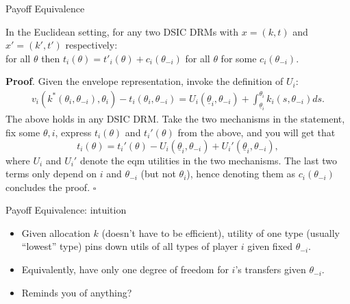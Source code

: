 \documentclass[english,10pt
,aspectratio=169
]{beamer}
\begin{document}
\begin{frame}{Payoff Equivalence}
	\begin{theorem}
		In the Euclidean setting, for any two DSIC DRMs with $x = (k,t)$ and $x' = (k',t')$ respectively:
		\\ 	
		 for all $\theta$ \alert{then $t_i(\theta) = t'_i(\theta) + c_i (\theta_{-i})$} for all $\theta$ for some $c_i(\theta_{-i})$.
	\end{theorem}
	\pause
	\textbf{Proof}. Given the envelope representation, invoke the definition of $U_i$:
	\vspace{-0.5em}\begin{align*}
		v_i(k^*(\theta_i,\theta_{-i}),\theta_i) - t_i(\theta_i,\theta_{-i}) = U_i (\underline{\theta}_i,\theta_{-i}) + \int_{\underline{\theta}_i}^{\theta_i} k_i(s,\theta_{-i}) d s.
	\end{align*}
	The above holds in any DSIC DRM. Take the two mechanisms in the statement, fix some $\theta,i$, express $t_i(\theta)$ and $t_i'(\theta)$ from the above, and you will get that
	\vspace{-0.5em}$$ t_i(\theta) = t_i'(\theta) - U_i (\underline{\theta}_i,\theta_{-i}) + U_i' (\underline{\theta}_i,\theta_{-i}),$$
	where $U_i$ and $U_i'$ denote the eqm utilities in the two mechanisms. The last two terms only depend on $i$ and $\theta_{-i}$ (but not $\theta_i$), hence denoting them as $c_i(\theta_{-i})$ concludes the proof. $\square$
\end{frame}


\begin{frame}{Payoff Equivalence: intuition}
\begin{itemize} 
	\item Given allocation $k$ (doesn't have to be efficient), utility of one type (usually ``lowest'' type) pins down utils of all types of player $i$ given fixed $\theta_{-i}$.
	\pause
	\item Equivalently, have only one degree of freedom for $i$'s transfers given $\theta_{-i}$.
	\item Reminds you of anything?
\end{itemize}
\end{frame}
\end{document}
